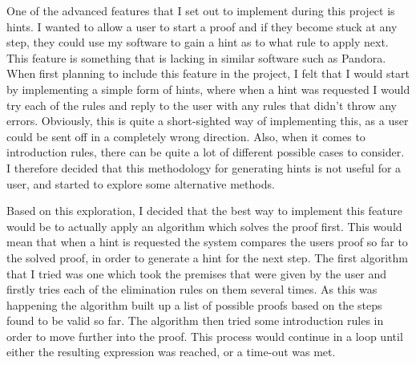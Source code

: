 One of the advanced features that I set out to implement during this project is hints. I wanted to allow a user to start a proof and if they become stuck at any step, they could use my software to gain a hint as to what rule to apply next. This feature is something that is lacking in similar software such as Pandora. When first planning to include this feature in the project,  I felt that I would start by implementing a simple form of hints, where when a hint was requested I would try each of the rules and reply to the user with any rules that didn't throw any errors. Obviously, this is quite a short-sighted way of implementing this, as a user could be sent off in a completely wrong direction. Also, when it comes to introduction rules, there can be quite a lot of different possible cases to consider. I therefore decided that this methodology for generating hints is not useful for a user, and started to explore some alternative methods.

Based on this exploration, I decided that the best way to implement this feature would be to actually apply an algorithm which solves the proof first. This would mean that when a hint is requested the system compares the users proof so far to the solved proof, in order to generate a hint for the next step. The first algorithm that I tried was one which took the premises that were given by the user and firstly tries each of the elimination rules on them several times. As this was happening the algorithm built up a list of possible proofs based on the steps found to be valid so far. The algorithm then tried some introduction rules in order to move further into the proof. This process would continue in a loop until either the resulting expression was reached, or a time-out was met. 

